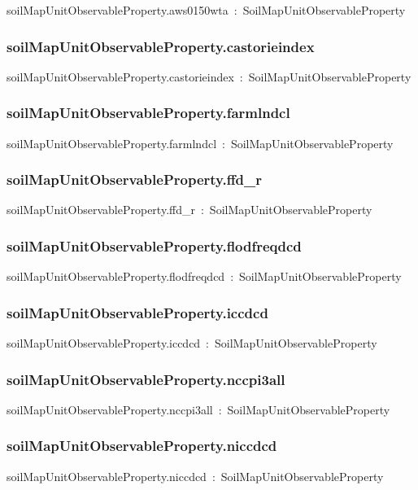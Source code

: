 \documentclass{article}
\begin{document}
soilMapUnitObservableProperty.aws0150wta~:~SoilMapUnitObservableProperty

\subsubsection*{soilMapUnitObservableProperty.castorieindex}

soilMapUnitObservableProperty.castorieindex~:~SoilMapUnitObservableProperty

\subsubsection*{soilMapUnitObservableProperty.farmlndcl}

soilMapUnitObservableProperty.farmlndcl~:~SoilMapUnitObservableProperty

\subsubsection*{soilMapUnitObservableProperty.ffd\_r}

soilMapUnitObservableProperty.ffd\_r~:~SoilMapUnitObservableProperty

\subsubsection*{soilMapUnitObservableProperty.flodfreqdcd}

soilMapUnitObservableProperty.flodfreqdcd~:~SoilMapUnitObservableProperty

\subsubsection*{soilMapUnitObservableProperty.iccdcd}

soilMapUnitObservableProperty.iccdcd~:~SoilMapUnitObservableProperty

\subsubsection*{soilMapUnitObservableProperty.nccpi3all}

soilMapUnitObservableProperty.nccpi3all~:~SoilMapUnitObservableProperty

\subsubsection*{soilMapUnitObservableProperty.niccdcd}

soilMapUnitObservableProperty.niccdcd~:~SoilMapUnitObservableProperty
\end{document}
